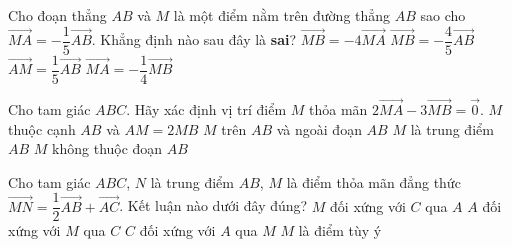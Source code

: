 \begin{ex}%
	Cho đoạn thẳng $ AB$ và $M$ là một điểm nằm trên đường thẳng $ AB$ sao cho $\overrightarrow{MA}=-\dfrac{1}{5}\overrightarrow{AB}$. Khẳng định nào sau đây là {\bf sai}?
	\choice
	{$\overrightarrow{MB}=-4\overrightarrow{MA}$}
	{\True $\overrightarrow{MB}=-\dfrac{4}{5}\overrightarrow{AB}$}
	{$\overrightarrow{AM}=\dfrac{1}{5}\overrightarrow{AB}$}
	{$\overrightarrow{MA}=-\dfrac{1}{4}\overrightarrow{MB}$}
\end{ex}
\begin{ex}%
	Cho tam giác $ABC$. Hãy xác định vị trí điểm $M$ thỏa mãn $2\overrightarrow{MA}-3\overrightarrow{MB}=\overrightarrow{0}$.
	\choice
	{$ M$ thuộc cạnh $AB$ và $AM=2MB$}
	{\True $M $ trên $AB$ và ngoài đoạn $AB $}
	{$ M$ là trung điểm $AB$}
	{$M $ không thuộc đoạn $AB$}
\end{ex}
\begin{ex}%
	Cho tam giác $ABC$, $N$ là trung điểm $AB$, $M$ là điểm thỏa mãn đẳng thức $\overrightarrow{MN}= \dfrac{1}{2} \overrightarrow{AB} + \overrightarrow{AC}$. Kết luận nào dưới đây đúng?
	\choice
	{\True $M$ đối xứng với $C$ qua $A$}
	{$A$ đối xứng với $M$ qua $C$}
	{$C$ đối xứng với $A$ qua $M$}
	{$M$ là điểm tùy ý}
\end{ex}
